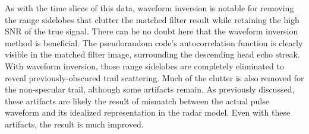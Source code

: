 As with the time slices of this data, waveform inversion is notable for removing the range sidelobes that clutter the matched filter result while retaining the high SNR of the true signal. There can be no doubt here that the waveform inversion method is beneficial. The pseudorandom code's autocorrelation function is clearly visible in the matched filter image, surrounding the descending head echo streak. With waveform inversion, those range sidelobes are completely eliminated to reveal previously-obscured trail scattering. Much of the clutter is also removed for the non-specular trail, although some artifacts remain. As previously discussed, these artifacts are likely the result of mismatch between the actual pulse waveform and its idealized representation in the radar model. Even with these artifacts, the result is much improved.

